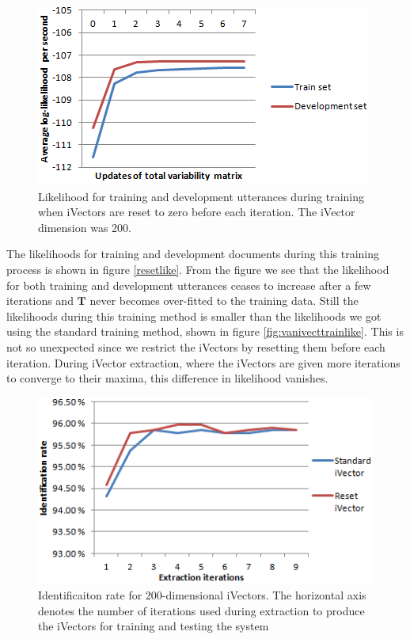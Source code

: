 \begin{figure}[hbt!]
	\begin{center}
	\includegraphics{figures/resetlike.png}
	\caption{Likelihood for training and development utterances during training when iVectors are reset to zero before each iteration. The iVector dimension was 200.}
	\label{fig:resetlike}
	\end{center}
\end{figure}

The likelihoods for training and development documents during this training process is shown in figure \ref{resetlike}. From the figure we see that the likelihood for both training and development utterances ceases to increase after a few iterations and $\mathbf{T}$ never becomes over-fitted to the training data. Still the likelihoods during this training method is smaller than the likelihoods we got using the standard training method, shown in figure \ref{fig:vanivecttrainlike}. This is not so unexpected since we restrict the iVectors by resetting them before each iteration. During iVector extraction, where the iVectors are given more iterations to converge to their maxima, this difference in likelihood vanishes.

\begin{figure}[hbt!]
	\begin{center}
	\includegraphics{figures/resetidentification.png}
	\caption{Identificaiton rate for 200-dimensional iVectors. The horizontal axis denotes the number of iterations used during extraction to produce the iVectors for training and testing the system}
	\label{fig:resetidrate}
	\end{center}
\end{figure}

